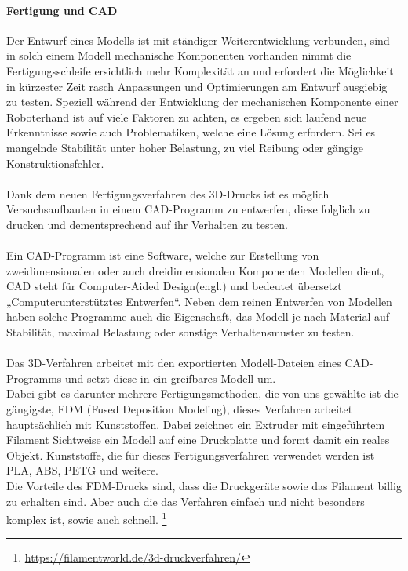 \documentclass[titlepage,12pt,twoside]{article}
\begin{document}
\paragraph{Fertigung und CAD}
\label{par:Fertigung und CAD}
\hfill \break
\hfill \break
Der Entwurf eines Modells ist mit ständiger Weiterentwicklung verbunden, sind in 
solch einem Modell mechanische Komponenten vorhanden nimmt die Fertigungsschleife 
ersichtlich mehr Komplexität an und erfordert die Möglichkeit in kürzester Zeit 
rasch Anpassungen und Optimierungen am Entwurf ausgiebig zu testen. Speziell 
während der Entwicklung der mechanischen Komponente einer Roboterhand ist auf 
viele Faktoren zu achten, es ergeben sich laufend neue Erkenntnisse sowie auch 
Problematiken, welche eine Lösung erfordern. Sei es mangelnde Stabilität unter 
hoher Belastung, zu viel Reibung oder gängige Konstruktionsfehler. \\
\\
Dank dem neuen Fertigungsverfahren des 3D-Drucks ist es möglich Versuchsaufbauten 
in einem CAD-Programm zu entwerfen, diese folglich zu drucken und dementsprechend 
auf ihr Verhalten zu testen. \\
\\
Ein CAD-Programm ist eine Software, welche zur Erstellung von zweidimensionalen 
oder auch dreidimensionalen Komponenten Modellen dient, CAD steht für Computer-Aided 
Design(engl.) und bedeutet übersetzt „Computerunterstütztes Entwerfen“. Neben 
dem reinen Entwerfen von Modellen haben solche Programme auch die Eigenschaft, 
das Modell je nach Material auf Stabilität, maximal Belastung oder sonstige 
Verhaltensmuster zu testen. \\
\\
Das 3D-Verfahren arbeitet mit den exportierten Modell-Dateien eines CAD-Programms 
und setzt diese in ein greifbares Modell um. \\
Dabei gibt es darunter mehrere Fertigungsmethoden, die von uns gewählte ist die 
gängigste, FDM (Fused Deposition Modeling), dieses Verfahren arbeitet hauptsächlich 
mit Kunststoffen. Dabei zeichnet ein Extruder mit eingeführtem Filament Sichtweise 
ein Modell auf eine Druckplatte und formt damit ein reales Objekt. Kunststoffe, 
die für dieses Fertigungsverfahren verwendet werden ist PLA, ABS, PETG und weitere. \\
Die Vorteile des FDM-Drucks sind, dass die Druckgeräte sowie das Filament billig 
zu erhalten sind. Aber auch die das Verfahren einfach und nicht besonders komplex 
ist, sowie auch schnell. \footnote{\url{https://filamentworld.de/3d-druckverfahren/}}\\
\end{document}
